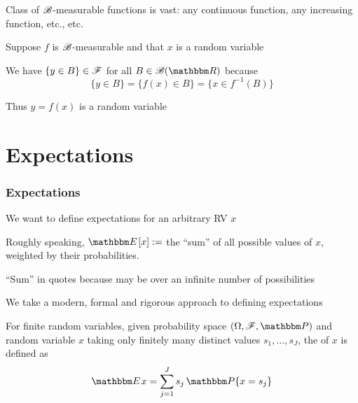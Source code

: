 \begin{frame}

    \vspace{2em}
    Class of $\mathscr B$-measurable functions is vast: any continuous function,
    any increasing function, etc., etc.
    
    \vspace{1em}
    Suppose $f$ is $\mathscr B$-measurable and that $x$
    is a random variable
    
    We have $\{y \in B\} \in \mathscr F$ for all $B \in \bB(\RR)$ because
    \begin{equation}
        \label{eq:byim}
        \{y \in B\} = \{f(x) \in B\} = \{x \in f^{-1}(B)\}
    \end{equation}
    
    Thus $y =f(x)$ is a random variable
    
\end{frame}
    
\section{Expectations}


\begin{frame}

    \frametitle{Expectations}
    
    \vspace{2em}
    We want to define expectations for an arbitrary RV $x$

    Roughly speaking, $\EE[x] :=$ the ``sum'' of all possible values of $x$,
    weighted by their probabilities.  

    ``Sum'' in quotes because may be over an infinite number of possibilities
    
    We take a modern, formal and rigorous approach to defining expectations

\end{frame}

\begin{frame}

    \vspace{2em}
    For finite random variables, given probability space $(\Omega, \fF, \PP)$ 
    and random variable $x$ 
    taking only finitely many distinct values $s_1, \ldots, s_J$,
    the  of $x$ is defined as
    \begin{equation}
        \label{eq:expec}
        \EE x = \sum_{j=1}^J s_j \, \PP\{x = s_j\}
    \end{equation} 
    
\end{frame}

